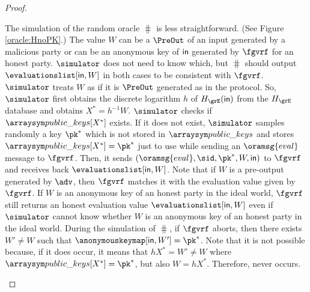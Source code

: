 \begin{proof}
\begin{itemize}
		
		The simulation of the random oracle $ \hash $ is less straightforward. (See Figure \ref{oracle:HnoPK}.)
		The value $ W $ can be a $ \PreOut $ of an input generated by a malicious party or can be an anonymous key of  $ \mathsf{in} $ generated by $ \fgvrf $ for an honest party. $ \simulator $ does not need to know which, but $ \hash $ should output $ \evaluationslist[\msg,W] $ in both cases to be consistent with $ \fgvrf $.	 
		$ \simulator $ treats $ W $ as if it is $ \PreOut $ generated as in the protocol. So, $ \simulator $ first obtains the discrete logarithm $ h $ of $ \hashG(\msg) $ from the $ \hashG $ database and obtains $ X^* = h^{-1}W $.    
		$ \simulator $ checks if $ \pkeys[X^*] $ exists. If it does not exist, $ \simulator $ samples randomly a key $ \pk^* $ which is not stored in $ \pkeys $ and stores $ \pkeys[X^*] = \pk^* $ just to use while sending an $ \oramsg{eval} $ message to $ \fgvrf $. Then, it sends  $ (\oramsg{eval}, \sid,\pk^*,W,\msg) $ to $ \fgvrf $ and receives back $ \evaluationslist[\msg,W] $.
		Note that if $ W $ is a pre-output generated by $ \adv $, then $ \fgvrf $ matches it with the evaluation value given by $ \fgvrf $. If $ W $ is an anonymous key of an honest party in the ideal world, $ \fgvrf $ still returns an honest evaluation value $ \evaluationslist[\msg,W] $ even if $ \simulator $ cannot know whether $ W $ is an anonymous key of an honest party in the ideal world. 
		During the simulation of $ \hash $, if $ \fgvrf $ aborts, then there exists $ W' \neq W $ such that $ \anonymouskeymap[\msg,W'] = \pk^* $. Note that it is not possible because, if it does occur, it means that $ hX^* = W' \neq W  $ where $ \pkeys[X^*] = \pk^* $, but also $ W = hX^* $. 
		Therefore,  never occurs.
		
		


\end{itemize}
\end{proof}
